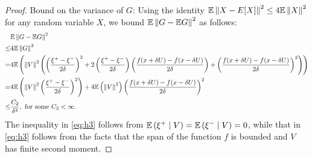 \begin{proof}
Bound on the variance of $G$:
Using the identity $\mathbb{E}\left\|X -  E[X]\right\|^2 \le 4 \mathbb{E} \left\|X\right\|^2$ for any random variable $X$, we bound $\mathbb{E}\left\| G - \mathbb{E} G\right\|^2$ as follows:
\begin{align}
&\mathbb{E}\left\| G - \mathbb{E} G\right\|^2 \\
\le& 4 \mathbb{E} \left\|G\right\|^2 \label{eq:mi}\\
= & 4\mathbb{E}\left( \left\| V \right\|^2 \left(\left(\dfrac{\xi^+ - \xi^-}{2\delta}\right)^2  + 2 \left(\dfrac{\xi^+ - \xi^-}{2\delta}\right) \left(\dfrac{f(x+\delta U) - f(x-\delta U)}{2\delta}\right) 
+ \left( \dfrac{f(x+\delta U) - f(x-\delta U)}{2\delta} \right)^2 \right)\right) \\
= & 4\mathbb{E}\left( \left\| V \right\|^2 \left(\dfrac{\xi^+ - \xi^-}{2\delta}\right)^2\right)   
+ 4 \mathbb{E} \left(\left\| V \right\|^2 \right)\left( \dfrac{f(x+\delta U) - f(x-\delta U)}{2\delta} \right)^2  \label{eq:h3} \\
\le & \frac{C_2}{\delta^2}, \text{ for some } C_2< \infty. \label{eq:h4}
\end{align}
The inequality in \eqref{eq:h3} follows from $\mathbb{E}\left( \xi^+ \mid V \right) = \mathbb{E}\left( \xi^- \mid V \right) = 0$, while that in \eqref{eq:h3} follows from the facts that  the span of the function $f$ is bounded and $V$ has finite second moment. 
\end{proof}


